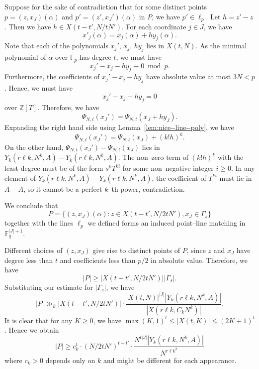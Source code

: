 \documentclass[12pt,reqno]{amsart}
\theoremstyle{plain}
\theoremstyle{definition}
\newcommand{\F}{\mathbb{F}}
\newcommand{\Z}{\mathbb{Z}}
\newcommand{\1}{\mathbf{1}}
\newcommand{\abs}[1]{\left|#1\right|}
\begin{document}
Suppose for the sake of contradiction that for some distinct points $p = (z, x_J)(\alpha)$ and $p' = (z', x_J')(\alpha)$ in $P$, we have $p' \in \ell_{p}$. Let $h = z' - z$. Then we have $h \in X(t - t', N / tN')$. For each coordinate $j \in J$, we have
$$x'_j(\alpha) = x_j(\alpha) + h y_j(\alpha).$$
Note that each of the polynomials $x_j'$, $x_j$, $hy_j$ lies in $X(t, N)$. As the minimal polynomial of $\alpha$ over $\F_p$ has degree $t$, we must have
$$x_j' - x_j - h y_j \equiv 0 \bmod{p}.$$
Furthermore, the coefficients of $x_j' - x_j - h y_j$ have absolute value at most $3N < p$. Hence, we must have
$$x_j' - x_j - h y_j  = 0$$
over $\Z[T]$.
Therefore, we have
$$\Psi_{N,t}(x_J') = \Psi_{N,t}(x_J + hy_J).$$
Expanding the right hand side using Lemma~\ref{lem:nice--line--poly}, we have
$$\Psi_{N,t}(x_J') = \Psi_{N,t}(x_J) + (k! h)^k.$$
On the other hand, $\Psi_{N,t}(x_J') - \Psi_{N,t}(x_J)$ lies in $Y_k(r \ell k, N^k, A) - Y_k(r \ell k, N^k, A)$. The non--zero term of $(k! h)^k$ with the least degree must be of the form $s^k T^{ki}$ for some non--negative integer $i \geq 0$. In any element of $Y_k(r \ell k, N^k, A) - Y_k(r \ell k, N^k, A)$, the coefficient of $T^{ki}$ must lie in $A - A$, so it cannot be a perfect $k$--th power, contradiction.

We conclude that
$$P = \{(z, x_J)(\alpha): z \in X(t - t', N / 2tN'), x_J \in \Gamma_s\}$$
together with the lines $\ell_p$ we defined forms an induced point--line matching in $\F_q^{|J| + 1}$. 

Different choices of $(z, x_J)$ give rise to distinct points of $P$, since $z$ and $x_J$ have degree less than $t$ and coefficients less than $p / 2$ in absolute value. Therefore, we have
$$\abs{P} \geq \abs{X(t - t', N / 2tN')} \abs{\Gamma_s}.$$
Substituting our estimate for $\abs{\Gamma_s}$, we have
$$\abs{P} \gg_k \abs{X(t - t', N / 2tN')} \cdot \frac{\abs{X(t, N)}^{\abs{J}}\abs{Y_k(r \ell k, N^k, A)}}{\abs{X(r \ell k, C_k N^k)}}.$$
It is clear that for any $K \geq 0$, we have $\max(K, 1)^t \leq \abs{X(t, K)} \leq (2K + 1)^t$. Hence we obtain
$$\abs{P} \geq c_k^{t} \cdot (N / 2tN')^{t - t'} \cdot \frac{N^{t\abs{J}}\abs{Y_k(r \ell k, N^k, A)}}{N^{r \ell k^2}}$$
where $c_k > 0$ depends only on $k$ and might be different for each appearance.
\end{document}
